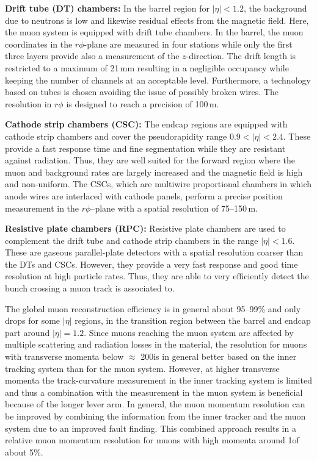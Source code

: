 \begin{description}
 \item \textbf{Drift tube (DT) chambers:} In the barrel region for $|\eta| < 1.2$, the background due to neutrons is low and likewise residual effects from the magnetic field. Here, the muon system is equipped with drift tube chambers. In the barrel, the muon coordinates in the $r\phi$-plane are measured in four stations while only the first three layers provide also a measurement of the $z$-direction. The drift length is restricted to a maximum of 21\,mm resulting in a negligible occupancy while keeping the number of channels at an acceptable level. Furthermore, a technology based on tubes is chosen avoiding the issue of possibly broken wires. The resolution in $r\phi$ is designed to reach a precision of 100\,\textmu m.
 \item \textbf{Cathode strip chambers (CSC):} The endcap regions are equipped with cathode strip chambers and cover the pseudorapidity range $0.9 < |\eta| < 2.4$. These provide a fast response time and fine segmentation while they are resistant against radiation. Thus, they are well suited for the forward region where the muon and background rates are largely increased and the magnetic field is high and non-uniform. The CSCs, which are multiwire proportional chambers in which anode wires are interlaced with cathode panels, perform a precise position measurement in the $r\phi$--plane with a spatial resolution of 75--150\,\textmu m. 
 \item \textbf{Resistive plate chambers (RPC):} Resistive plate chambers are used to complement the drift tube and cathode strip chambers in the range $|\eta| < 1.6$. These are gaseous parallel-plate detectors with a spatial resolution coarser than the DTs and CSCs. However, they provide a very fast response and good time resolution at high particle rates. Thus, they are able to very efficiently detect the bunch crossing a muon track is associated to. 
\end{description}
The global muon reconstruction efficiency is in general about 95--99\% and only drops for some $|\eta|$ regions, \eg in the transition region between the barrel and endcap part around $|\eta|=1.2$. Since muons reaching the muon system are affected by multiple scattering and radiation losses in the material, the resolution for muons with transverse momenta below $\approx$ 200\gev is in general better based on the inner tracking system than for the muon system. However, at higher transverse momenta the track-curvature measurement in the inner tracking system is limited and thus a combination with the measurement in the muon system is beneficial because of the longer lever arm. In general, the muon momentum resolution can be improved by combining the information from the inner tracker and the muon system due to an improved fault finding. This combined approach results in a relative muon momentum resolution for muons with high momenta around 1\tev of about 5\%.

